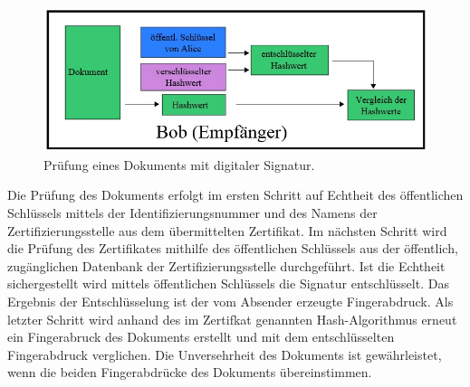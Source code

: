 \begin{figure}[!ht]
    \centering
    \includegraphics[width=\textwidth]{PruefungEmpfaenger2.jpg}
    \caption[Prüfung eines Dokuments mit digitaler Signatur]{Prüfung eines Dokuments mit digitaler Signatur. \cite{techno3}}
    \label{fig:3}
\end{figure}
Die Prüfung des Dokuments erfolgt im ersten Schritt auf Echtheit des öffentlichen Schlüssels mittels der Identifizierungsnummer und des Namens der Zertifizierungsstelle aus dem übermittelten Zertifikat. Im nächsten Schritt wird die Prüfung des Zertifikates mithilfe des öffentlichen Schlüssels aus der öffentlich, zugänglichen Datenbank der Zertifizierungsstelle durchgeführt. Ist die Echtheit sichergestellt wird mittels öffentlichen Schlüssels die Signatur entschlüsselt. Das Ergebnis der Entschlüsselung ist der vom Absender erzeugte Fingerabdruck. Als letzter Schritt wird anhand des im Zertifkat genannten Hash-Algorithmus erneut ein Fingerabruck des Dokuments erstellt und mit dem entschlüsselten Fingerabdruck verglichen. Die Unversehrheit des Dokuments ist gewährleistet, wenn die beiden Fingerabdrücke des Dokuments übereinstimmen. \cite{techno1}